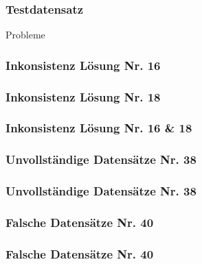 
\begin{frame}
    \frametitle{Testdatensatz}
    \begin{center}
    \huge{Probleme}
    \end{center}
\end{frame}

\begin{frame}
  \frametitle{Inkonsistenz \hfill Lösung Nr. 16}
\end{frame}

\begin{frame}
  \frametitle{Inkonsistenz \hfill Lösung Nr. 18}
\end{frame}

\begin{frame}
  \frametitle{Inkonsistenz \hfill Lösung Nr. 16 \& 18}
\end{frame}

\begin{frame}
  \frametitle{Unvollständige Datensätze \hfill Nr. 38}
\end{frame}

\begin{frame}
  \frametitle{Unvollständige Datensätze \hfill Nr. 38}
\end{frame}


\begin{frame}
  \frametitle{Falsche Datensätze \hfill Nr. 40}
\end{frame}

\begin{frame}
  \frametitle{Falsche Datensätze \hfill Nr. 40}
\end{frame}

